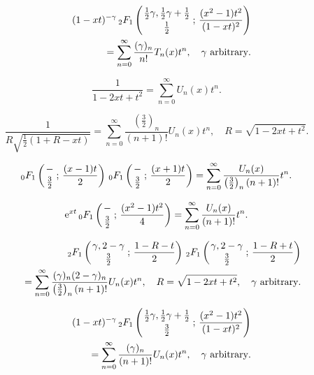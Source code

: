 \documentclass[envcountchap,graybox]{svmono}
\newcommand{\hyp}[5]{\mbox{}_{#1}{F}_{#2}
\left(\genfrac{}{}{0pt}{}{#3}{#4}\,;\,#5\right)}
\newcommand{\e}{\textrm{e}}
\begin{document}
\begin{eqnarray}
\label{GenChebyshevI6}
& &(1-xt)^{-\gamma}\,\hyp{2}{1}{\frac{1}{2}\gamma,\frac{1}{2}\gamma+\frac{1}{2}}{\frac{1}{2}}
{\frac{(x^2-1)t^2}{(1-xt)^2}}\nonumber\\
& &=\sum_{n=0}^{\infty}\frac{(\gamma)_n}{n!}T_n(x)t^n,\quad\textrm{$\gamma$ arbitrary}.
\end{eqnarray}

\begin{equation}
\label{GenChebyshevII1}
\frac{1}{1-2xt+t^2}=\sum_{n=0}^{\infty}U_n(x)t^n.
\end{equation}

\begin{equation}
\label{GenChebyshevII2}
\frac{1}{R\sqrt{\frac{1}{2}(1+R-xt)}}=\sum_{n=0}^{\infty}
\frac{\left(\frac{3}{2}\right)_n}{(n+1)!}U_n(x)t^n,\quad R=\sqrt{1-2xt+t^2}.
\end{equation}

\begin{equation}
\label{GenChebyshevII3}
\hyp{0}{1}{-}{\frac{3}{2}}{\frac{(x-1)t}{2}}\,
\hyp{0}{1}{-}{\frac{3}{2}}{\frac{(x+1)t}{2}}=
\sum_{n=0}^{\infty}\frac{U_n(x)}{\left(\frac{3}{2}\right)_n(n+1)!}t^n.
\end{equation}

\begin{equation}
\label{GenChebyshevII4}
\e^{xt}\,\hyp{0}{1}{-}{\frac{3}{2}}{\frac{(x^2-1)t^2}{4}}=
\sum_{n=0}^{\infty}\frac{U_n(x)}{(n+1)!}t^n.
\end{equation}

\begin{eqnarray}
\label{GenChebyshevII5}
& &\hyp{2}{1}{\gamma,2-\gamma}{\frac{3}{2}}{\frac{1-R-t}{2}}\,
\hyp{2}{1}{\gamma,2-\gamma}{\frac{3}{2}}{\frac{1-R+t}{2}}\nonumber\\
& &{}=\sum_{n=0}^{\infty}\frac{(\gamma)_n(2-\gamma)_n}{\left(\frac{3}{2}\right)_n(n+1)!}U_n(x)t^n,
\quad R=\sqrt{1-2xt+t^2},\quad\textrm{$\gamma$ arbitrary}.
\end{eqnarray}

\begin{eqnarray}
\label{GenChebyshevII6}
& &(1-xt)^{-\gamma}\,\hyp{2}{1}{\frac{1}{2}\gamma,\frac{1}{2}\gamma+\frac{1}{2}}{\frac{3}{2}}
{\frac{(x^2-1)t^2}{(1-xt)^2}}\nonumber\\
& &{}=\sum_{n=0}^{\infty}\frac{(\gamma)_n}{(n+1)!}U_n(x)t^n,\quad\textrm{$\gamma$ arbitrary}.
\end{eqnarray}
\end{document}
